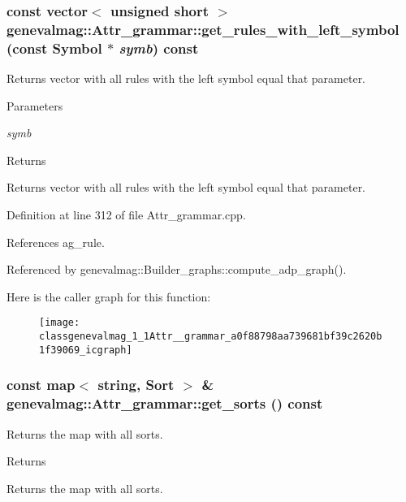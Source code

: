\hypertarget{classgenevalmag_1_1Attr__grammar_a0f88798aa739681bf39c2620b1f39069}{
\subsubsection[{get\_\-rules\_\-with\_\-left\_\-symbol}]{\setlength{\rightskip}{0pt plus 5cm}const vector$<$ unsigned short $>$ genevalmag::Attr\_\-grammar::get\_\-rules\_\-with\_\-left\_\-symbol (const {\bf Symbol} $\ast$ {\em symb}) const}}
\label{classgenevalmag_1_1Attr__grammar_a0f88798aa739681bf39c2620b1f39069}
Returns vector with all rules with the left symbol equal that parameter. 
\begin{DoxyParams}{Parameters}
\item[{\em symb}]\end{DoxyParams}
\begin{DoxyReturn}{Returns}

\end{DoxyReturn}
Returns vector with all rules with the left symbol equal that parameter. 

Definition at line 312 of file Attr\_\-grammar.cpp.



References ag\_\-rule.



Referenced by genevalmag::Builder\_\-graphs::compute\_\-adp\_\-graph().



Here is the caller graph for this function:\nopagebreak
\begin{figure}[H]
\begin{center}
\leavevmode
\texttt{[image: classgenevalmag\_1\_1Attr\_\_grammar\_a0f88798aa739681bf39c2620b1f39069\_icgraph]}
\end{center}
\end{figure}


\hypertarget{classgenevalmag_1_1Attr__grammar_a9e56cac2670355a2d93e3cd20afc1c2d}{
\subsubsection[{get\_\-sorts}]{\setlength{\rightskip}{0pt plus 5cm}const map$<$ string, {\bf Sort} $>$ \& genevalmag::Attr\_\-grammar::get\_\-sorts () const}}
\label{classgenevalmag_1_1Attr__grammar_a9e56cac2670355a2d93e3cd20afc1c2d}
Returns the map with all sorts. \begin{DoxyReturn}{Returns}

\end{DoxyReturn}
Returns the map with all sorts. 

